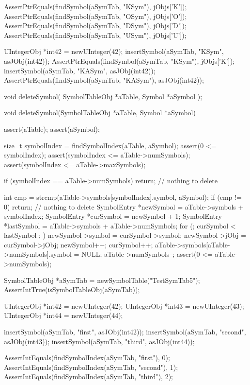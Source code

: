   AssertPtrEquals(findSymbol(aSymTab, "KSym"), jObjs['K']);
  AssertPtrEquals(findSymbol(aSymTab, "OSym"), jObjs['O']);
  AssertPtrEquals(findSymbol(aSymTab, "DSym"), jObjs['D']);
  AssertPtrEquals(findSymbol(aSymTab, "USym"), jObjs['U']);
  
  UIntegerObj *int42 = newUInteger(42);
  insertSymbol(aSymTab, "KSym", asJObj(int42));
  AssertPtrEquals(findSymbol(aSymTab, "KSym"), jObjs['K']);
  insertSymbol(aSymTab, "KASym", asJObj(int42));
  AssertPtrEquals(findSymbol(aSymTab, "KASym"), asJObj(int42));
\stopCTest
\stopTestCase
\stopTestSuite

\startTestSuite[deleteSymbol]

\startCHeader
void deleteSymbol(
  SymbolTableObj *aTable,
  Symbol         *aSymbol
);
\stopCHeader

\startCCode
void deleteSymbol(SymbolTableObj *aTable, Symbol *aSymbol) {
  assert(aTable);
  assert(aSymbol);
  
  size_t symbolIndex = findSymbolIndex(aTable, aSymbol);
  assert(0 <= symbolIndex);
  assert(symbolIndex <= aTable->numSymbols);
  assert(symbolIndex <= aTable->maxSymbols);

  if (symbolIndex == aTable->numSymbols) return; // nothing to delete
  
  int cmp = strcmp(aTable->symbols[symbolIndex].symbol, aSymbol);
  if (cmp != 0) return; // nothing to delete
  SymbolEntry *newSymbol = aTable->symbols + symbolIndex;
  SymbolEntry *curSymbol = newSymbol + 1;
  SymbolEntry *lastSymbol = aTable->symbols + aTable->numSymbols;
  for (; curSymbol < lastSymbol ; ) {
    newSymbol->symbol = curSymbol->symbol;
    newSymbol->jObj   = curSymbol->jObj;
    newSymbol++;
    curSymbol++;
  }
  aTable->symbols[aTable->numSymbols].symbol = NULL;
  aTable->numSymbols--;
  assert(0 <= aTable->numSymbols);
}
\stopCCode


\startCTest
  SymbolTableObj *aSymTab = newSymbolTable("TestSymTab5");
  AssertIntTrue(isSymbolTableObj(aSymTab));
  
  UIntegerObj *int42 = newUInteger(42);
  UIntegerObj *int43 = newUInteger(43);
  UIntegerObj *int44 = newUInteger(44);
  
  insertSymbol(aSymTab, "first",  asJObj(int42));
  insertSymbol(aSymTab, "second", asJObj(int43));
  insertSymbol(aSymTab, "third",  asJObj(int44));
  
  AssertIntEquals(findSymbolIndex(aSymTab, "first"),  0);
  AssertIntEquals(findSymbolIndex(aSymTab, "second"), 1);
  AssertIntEquals(findSymbolIndex(aSymTab, "third"),  2);

